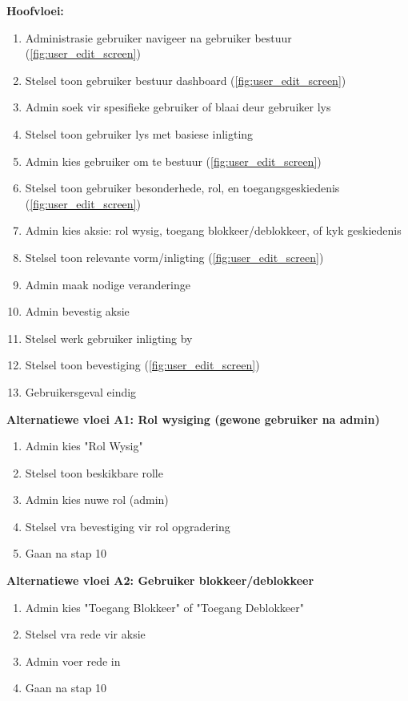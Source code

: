 \textbf{Hoofvloei:}
\begin{enumerate}
    \item Administrasie gebruiker navigeer na gebruiker bestuur (\autoref{fig:user_edit_screen})
    \item Stelsel toon gebruiker bestuur dashboard (\autoref{fig:user_edit_screen})
    \item Admin soek vir spesifieke gebruiker of blaai deur gebruiker lys
    \item Stelsel toon gebruiker lys met basiese inligting
    \item Admin kies gebruiker om te bestuur (\autoref{fig:user_edit_screen})
    \item Stelsel toon gebruiker besonderhede, rol, en toegangsgeskiedenis (\autoref{fig:user_edit_screen})
    \item Admin kies aksie: rol wysig, toegang blokkeer/deblokkeer, of kyk geskiedenis
    \item Stelsel toon relevante vorm/inligting (\autoref{fig:user_edit_screen})
    \item Admin maak nodige veranderinge
    \item Admin bevestig aksie
    \item Stelsel werk gebruiker inligting by
    \item Stelsel toon bevestiging (\autoref{fig:user_edit_screen})
    \item Gebruikersgeval eindig
\end{enumerate}

\textbf{Alternatiewe vloei A1: Rol wysiging (gewone gebruiker na admin)}
\begin{enumerate}
    \item[7a.] Admin kies "Rol Wysig"
    \item Stelsel toon beskikbare rolle
    \item Admin kies nuwe rol (admin)
    \item Stelsel vra bevestiging vir rol opgradering
    \item Gaan na stap 10
\end{enumerate}

\textbf{Alternatiewe vloei A2: Gebruiker blokkeer/deblokkeer}
\begin{enumerate}
    \item[7b.] Admin kies "Toegang Blokkeer" of "Toegang Deblokkeer"
    \item Stelsel vra rede vir aksie
    \item Admin voer rede in
    \item Gaan na stap 10
\end{enumerate}

